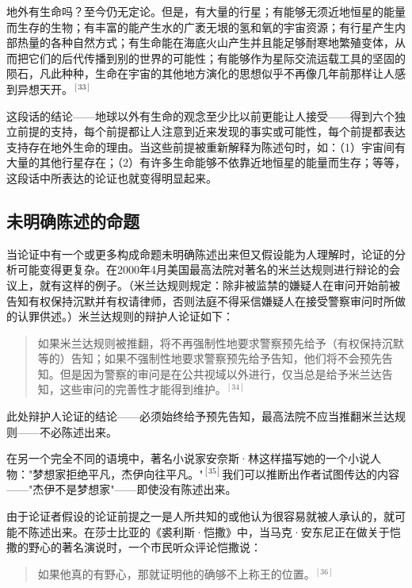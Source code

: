 \begin{displayquote}
地外有生命吗？至今仍无定论。但是，有大量的行星；有能够无须近地恒星的能量而生存的生物；有丰富的能产生水的广袤无垠的氢和氧的宇宙资源；有行星产生内部热量的各种自然方式；有生命能在海底火山产生并且能足够耐寒地繁殖变体，从而把它们的后代传播到别的世界的可能性；有能够作为星际交流运载工具的坚固的陨石，凡此种种，生命在宇宙的其他地方演化的思想似乎不再像几年前那样让人感到异想天开。${}^{[33]}$
\end{displayquote}

这段话的结论——地球以外有生命的观念至少比以前更能让人接受——得到六个独立前提的支持，每个前提都让人注意到近来发现的事实或可能性，每个前提都表达支持存在地外生命的理由。当这些前提被重新解释为陈述句时，如：（1）宇宙间有大量的其他行星存在；（2）有许多生命能够不依靠近地恒星的能量而生存；等等，这段话中所表达的论证也就变得明显起来。

\subsection{未明确陈述的命题}

当论证中有一个或更多构成命题未明确陈述出来但又假设能为人理解时，论证的分析可能变得更复杂。在2000年4月美国最高法院对著名的米兰达规则进行辩论的会议上，就有这样的例子。（米兰达规则规定：除非被监禁的嫌疑人在审问开始前被告知有权保持沉默并有权请律师，否则法庭不得采信嫌疑人在接受警察审问时所做的认罪供述。）米兰达规则的辩护人论证如下：

\begin{quotation}
如果米兰达规则被推翻，将不再强制性地要求警察预先给予（有权保持沉默等的）告知；如果不强制性地要求警察预先给予告知，他们将不会预先告知。但是因为警察的审问是在公共视域以外进行，仅当总是给予米兰达告知，这些审问的完善性才能得到维护。${}^{[34]}$
\end{quotation}

此处辩护人论证的结论——必须始终给予预先告知，最高法院不应当推翻米兰达规则——不必陈述出来。

在另一个完全不同的语境中，著名小说家安奈斯·林这样描写她的一个小说人物："梦想家拒绝平凡，杰伊向往平凡。"${}^{[35]}$我们可以推断出作者试图传达的内容——"杰伊不是梦想家"——即使没有陈述出来。

由于论证者假设的论证前提之一是人所共知的或他认为很容易就被人承认的，就可能不陈述出来。在莎士比亚的《裘利斯·恺撒》中，当马克·安东尼正在做关于恺撒的野心的著名演说时，一个市民听众评论恺撒说：

\begin{quotation}
如果他真的有野心，那就证明他的确够不上称王的位置。${}^{[36]}$
\end{quotation}

